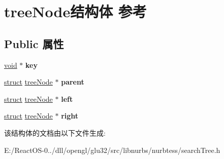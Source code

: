 \hypertarget{structtree_node}{}\section{tree\+Node结构体 参考}
\label{structtree_node}
\subsection*{Public 属性}
\begin{DoxyCompactItemize}
\item 
\mbox{\label{structtree_node_a42d002f817f136a2305c3c10b5f603f6}} 
\hyperlink{interfacevoid}{void} $\ast$ {\bfseries key}
\item 
\mbox{\label{structtree_node_a3d69c12b65c3d0df26fcf01c9e3b2e52}} 
\hyperlink{interfacestruct}{struct} \hyperlink{structtree_node}{tree\+Node} $\ast$ {\bfseries parent}
\item 
\mbox{\label{structtree_node_abd224b9939764b9ffe8e5c85287fa77b}} 
\hyperlink{interfacestruct}{struct} \hyperlink{structtree_node}{tree\+Node} $\ast$ {\bfseries left}
\item 
\mbox{\label{structtree_node_a09f70d5b69bbcdb1301f6bf364f9c18d}} 
\hyperlink{interfacestruct}{struct} \hyperlink{structtree_node}{tree\+Node} $\ast$ {\bfseries right}
\end{DoxyCompactItemize}


该结构体的文档由以下文件生成\+:\begin{DoxyCompactItemize}
\item 
E\+:/\+React\+O\+S-\/0../dll/opengl/glu32/src/libnurbs/nurbtess/search\+Tree.\+h\end{DoxyCompactItemize}
